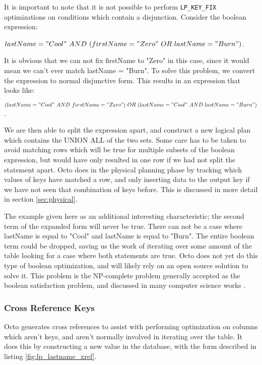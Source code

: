 \documentclass[]{article}
\def\code#1{\texttt{#1}}
\begin{document}
It is important to note that it is not possible to perform \code{LP\_KEY\_FIX} optimizations on conditions which contain a disjunction.
Consider the boolean expression:

$lastName = "Cool"\ AND\ (firstName = "Zero"\ OR\ lastName = "Burn")$.

It is obvious that we can not fix firstName to "Zero" in this case, since it would mean we can't ever match lastName = "Burn".
To solve this problem, we convert the expression to normal disjunctive form.
This results in an expression that looks like:

$(lastName = "Cool"\ AND\ firstName = "Zero")\ OR\ (lastName = "Cool"\ AND\ lastName = "Burn")$.

We are then able to split the expression apart, and construct a new logical plan which contains the UNION ALL of the two sets.
Some care has to be taken to avoid matching rows which will be true for multiple subsets of the boolean expression, but would have only resulted in one row if we had not split the statement apart.
Octo does in the physical planning phase by tracking which values of keys have matched a row, and only inserting data to the output key if we have not seen that combination of keys before.
This is discussed in more detail in section \ref{sec:physical}.

The example given here as an additional interesting characteristic; the second term of the expanded form will never be true.
There can not be a case where lastName is equal to "Cool" and lastName is equal to "Burn".
The entire boolean term could be dropped, saving us the work of iterating over some amount of the table looking for a case where both statements are true.
Octo does not yet do this type of boolean optimization, and will likely rely on an open source solution to solve it.
This problem is the NP-complete problem generally accepted as the boolean satisfaction problem, and discussed in many computer science works \cite{cook_complexity_1971}.

\subsubsection{Cross Reference Keys} \label{sec:lp_xref_keys}

Octo generates cross references to assist with performing optimization on columns which aren't keys, and aren't normally involved in iterating over the table.
It does this by constructing a new value in the database, with the form described in listing \ref{fig:lp_lastname_xref}.
\end{document}
